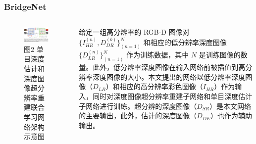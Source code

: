 \documentclass[aspectratio=169,12pt]{beamer}
\begin{document}
\begin{frame}[t]
	\frametitle{BridgeNet}
	\begin{columns}
		\begin{column}{.50\linewidth}
			\begin{figure}
				\centering
				\includegraphics[scale=0.23]{13.png}
				\caption{\small \color{captiongray}图2 单目深度估计和深度图像超分辨率重建联合学习网络架构示意图}
			\end{figure}
		\end{column}
		\begin{column}{.50\linewidth}
			{\footnotesize
				给定一组高分辨率的 RGB-D 图像对 $\{I_{HR}^{(n)},D_{DR}^{(b)}\}_{(n=1)}^N$ 和相应的低分辨率深度图像 $\{D_{LR}^{(n)}\}_{(n=1)}^𝑁$ 作为训练数据，其中 $N$ 是训练图像的数量。此外，低分辨率深度图像在输入网络前被插值到高分辨率深度图像的大小。本文提出的网络以低分辨率深度图像（$D_{LR}$）和相应的高分辨率彩色图像（$I_{HR}$）作为输入，同时对深度图像超分辨率重建子网络和单目深度估计子网络进行训练。超分辨的深度图像（$D_{SR}$）是本文网络的主要输出，此外，估计的深度图像（$D_{DE}$）也作为辅助输出。}	
		\end{column}
	\end{columns}

\end{frame}
\end{document}
